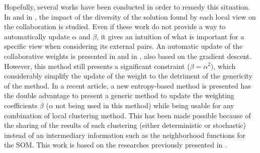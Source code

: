 \documentclass[a4paper]{report}
\begin{document}
    Hopefully, several works have been conducted in order to remedy this situation. In \cite{grozavu2014diversity} and in \cite{rastin2015collaborative}, the impact of the diversity of the solution found by each local view on the collaboration is studied. Even if these work do not provide a way to automatically update $\alpha$ and $\beta$, it gives an intuition of what is important for a specific view when considering its external pairs. An automatic update of the collaborative weights is presented in \cite{grozavu2010topological} and in \cite{grozavu2011learning}, also based on the gradient descent. However, this method still presents a significant constraint ($\beta = \alpha^2)$, which considerably simplify the update of the weight to the detriment of the genericity of the method. In a recent article, a new entropy-based method is presented \cite{sublime2018optimizing} has the double advantage to present a generic method to update the weighting coefficients $\beta$ ($\alpha$ not being used in this method) while being usable for any combination of local clustering method. This has been made possible because of the sharing of the results of each clustering (either deterministic or stochastic) instead of an intermediary information such as the neighborhood functions for the SOM. This work is based on the researches previously presented in \cite{sublime2016contributions}.

    
    
\end{document}
